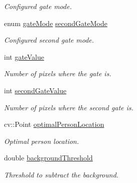 \begin{DoxyCompactItemize}
\begin{DoxyCompactList}\small\item\em Configured gate mode. \end{DoxyCompactList}\item 
\mbox{\label{structdto_1_1_camera_ad9075efd9230582c7358452e097e9a8a}} 
enum \mbox{\hyperlink{structdto_1_1_camera_aba1051d9f599fac2813a0a7bfa50729d}{gate\+Mode}} \mbox{\hyperlink{structdto_1_1_camera_ad9075efd9230582c7358452e097e9a8a}{second\+Gate\+Mode}}
\begin{DoxyCompactList}\small\item\em Configured second gate mode. \end{DoxyCompactList}\item 
\mbox{\label{structdto_1_1_camera_acc41f591ed7508ba31409c1df7e8b221}} 
int \mbox{\hyperlink{structdto_1_1_camera_acc41f591ed7508ba31409c1df7e8b221}{gate\+Value}}
\begin{DoxyCompactList}\small\item\em Number of pixels where the gate is. \end{DoxyCompactList}\item 
\mbox{\label{structdto_1_1_camera_afb2ede9c781530864a1095ea55614bc8}} 
int \mbox{\hyperlink{structdto_1_1_camera_afb2ede9c781530864a1095ea55614bc8}{second\+Gate\+Value}}
\begin{DoxyCompactList}\small\item\em Number of pixels where the second gate is. \end{DoxyCompactList}\item 
\mbox{\label{structdto_1_1_camera_ad17b09976fdf655da8bfc4e7be06c52a}} 
cv\+::\+Point \mbox{\hyperlink{structdto_1_1_camera_ad17b09976fdf655da8bfc4e7be06c52a}{optimal\+Person\+Location}}
\begin{DoxyCompactList}\small\item\em Optimal person location. \end{DoxyCompactList}\item 
\mbox{\label{structdto_1_1_camera_a5b49187642c40cb37bc8f795d0afb699}} 
double \mbox{\hyperlink{structdto_1_1_camera_a5b49187642c40cb37bc8f795d0afb699}{background\+Threshold}}
\begin{DoxyCompactList}\small\item\em Threshold to subtract the background. \end{DoxyCompactList}\item 

\end{DoxyCompactItemize}
